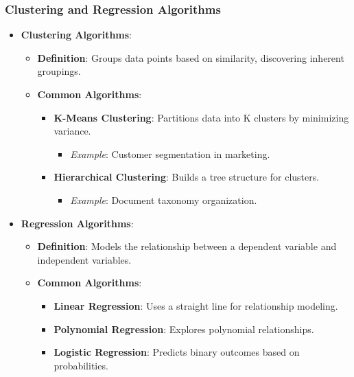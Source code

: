 \documentclass{beamer}
\begin{document}
\begin{frame}[fragile]
    \frametitle{Clustering and Regression Algorithms}
    \begin{itemize}
        \item \textbf{Clustering Algorithms}:
        \begin{itemize}
            \item \textbf{Definition}: Groups data points based on similarity, discovering inherent groupings.
            \item \textbf{Common Algorithms}:
            \begin{itemize}
                \item \textbf{K-Means Clustering}: Partitions data into K clusters by minimizing variance.
                \begin{itemize}
                    \item \textit{Example}: Customer segmentation in marketing.
                \end{itemize}
                \item \textbf{Hierarchical Clustering}: Builds a tree structure for clusters.
                \begin{itemize}
                    \item \textit{Example}: Document taxonomy organization.
                \end{itemize}
            \end{itemize}
        \end{itemize}
        \item \textbf{Regression Algorithms}:
        \begin{itemize}
            \item \textbf{Definition}: Models the relationship between a dependent variable and independent variables.
            \item \textbf{Common Algorithms}:
            \begin{itemize}
                \item \textbf{Linear Regression}: Uses a straight line for relationship modeling.
                \item \textbf{Polynomial Regression}: Explores polynomial relationships.
                \item \textbf{Logistic Regression}: Predicts binary outcomes based on probabilities.
            \end{itemize}
        \end{itemize}
    \end{itemize}
\end{frame}
\end{document}
